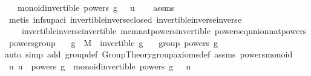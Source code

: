 \begin{isabellebody}
\ \ \ {\isachardoublequoteopen}monoid{\isachardot}{\kern0pt}invertible\ {\isacharparenleft}{\kern0pt}powers\ g{\isacharparenright}{\kern0pt}\ {\isacharparenleft}{\kern0pt}{\isasymcdot}{\isacharparenright}{\kern0pt}\ {\isasymone}\ u{\isachardoublequoteclose}\isanewline
%
\isadelimproof
\ \ %
\endisadelimproof
%
\isatagproof
{}\isamarkupfalse%
\ assms\ \isamarkupfalse%
\ {\isacharparenleft}{\kern0pt}metis\ inf{\isacharunderscore}{\kern0pt}sup{\isacharunderscore}{\kern0pt}aci{\isacharparenleft}{\kern0pt}{}{\isacharparenright}{\kern0pt}\ invertible{\isacharunderscore}{\kern0pt}inverse{\isacharunderscore}{\kern0pt}closed\ invertible{\isacharunderscore}{\kern0pt}inverse{\isacharunderscore}{\kern0pt}inverse\ \isanewline
\ \ \ \ invertible{\isacharunderscore}{\kern0pt}inverse{\isacharunderscore}{\kern0pt}invertible\ mem{\isacharunderscore}{\kern0pt}nat{\isacharunderscore}{\kern0pt}powers{\isacharunderscore}{\kern0pt}invertible\ powers{\isacharunderscore}{\kern0pt}eq{\isacharunderscore}{\kern0pt}union{\isacharunderscore}{\kern0pt}nat{\isacharunderscore}{\kern0pt}powers{\isacharparenright}{\kern0pt}%
\endisatagproof
{\isafoldproof}%
%
\isadelimproof
\isanewline
%
\endisadelimproof
\isanewline
{}\isamarkupfalse%
\ powers{\isacharunderscore}{\kern0pt}group{\isacharcolon}{\kern0pt}\isanewline
\ \ \ {\isachardoublequoteopen}g\ {\isasymin}\ M{\isachardoublequoteclose}\ \ {\isachardoublequoteopen}invertible\ g{\isachardoublequoteclose}\isanewline
\ \ \ {\isachardoublequoteopen}group\ {\isacharparenleft}{\kern0pt}powers\ g{\isacharparenright}{\kern0pt}\ {\isacharparenleft}{\kern0pt}{\isasymcdot}{\isacharparenright}{\kern0pt}\ {\isasymone}{\isachardoublequoteclose}\isanewline
%
\isadelimproof
%
\endisadelimproof
%
\isatagproof
{}\isamarkupfalse%
{\isacharparenleft}{\kern0pt}auto\ simp\ add{\isacharcolon}{\kern0pt}\ group{\isacharunderscore}{\kern0pt}def\ Group{\isacharunderscore}{\kern0pt}Theory{\isachardot}{\kern0pt}group{\isacharunderscore}{\kern0pt}axioms{\isacharunderscore}{\kern0pt}def\ assms\ powers{\isacharunderscore}{\kern0pt}monoid{\isacharparenright}{\kern0pt}\isanewline
\ \ \isamarkupfalse%
\ {\isachardoublequoteopen}{\isasymAnd}u{\isachardot}{\kern0pt}\ u\ {\isasymin}\ powers\ g\ {\isasymLongrightarrow}\ monoid{\isachardot}{\kern0pt}invertible\ {\isacharparenleft}{\kern0pt}powers\ g{\isacharparenright}{\kern0pt}\ {\isacharparenleft}{\kern0pt}{\isasymcdot}{\isacharparenright}{\kern0pt}\ {\isasymone}\ u{\isachardoublequoteclose}\ \isamarkupfalse%

\end{isabellebody}
